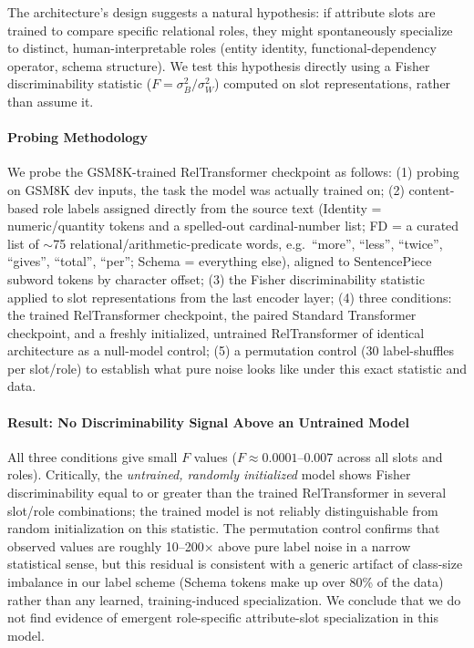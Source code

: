 \documentclass[review]{elsarticle}
\begin{document}
The architecture's design suggests a natural hypothesis: if attribute slots are trained to compare specific relational roles, they might spontaneously specialize to distinct, human-interpretable roles (entity identity, functional-dependency operator, schema structure). We test this hypothesis directly using a Fisher discriminability statistic ($F{=}\sigma_B^2/\sigma_W^2$) computed on slot representations, rather than assume it.

\paragraph{Probing Methodology}
We probe the GSM8K-trained RelTransformer checkpoint as follows: (1) probing on GSM8K dev inputs, the task the model was actually trained on; (2) content-based role labels assigned directly from the source text (Identity = numeric/quantity tokens and a spelled-out cardinal-number list; FD = a curated list of $\sim$75 relational/arithmetic-predicate words, e.g.\ ``more'', ``less'', ``twice'', ``gives'', ``total'', ``per''; Schema = everything else), aligned to SentencePiece subword tokens by character offset; (3) the Fisher discriminability statistic applied to slot representations from the last encoder layer; (4) three conditions: the trained RelTransformer checkpoint, the paired Standard Transformer checkpoint, and a freshly initialized, untrained RelTransformer of identical architecture as a null-model control; (5) a permutation control (30 label-shuffles per slot/role) to establish what pure noise looks like under this exact statistic and data.

\paragraph{Result: No Discriminability Signal Above an Untrained Model}
All three conditions give small $F$ values ($F{\approx}0.0001$--$0.007$ across all slots and roles). Critically, the \emph{untrained, randomly initialized} model shows Fisher discriminability equal to or greater than the trained RelTransformer in several slot/role combinations; the trained model is not reliably distinguishable from random initialization on this statistic. The permutation control confirms that observed values are roughly 10--200$\times$ above pure label noise in a narrow statistical sense, but this residual is consistent with a generic artifact of class-size imbalance in our label scheme (Schema tokens make up over 80\% of the data) rather than any learned, training-induced specialization. We conclude that we do not find evidence of emergent role-specific attribute-slot specialization in this model.
\end{document}

